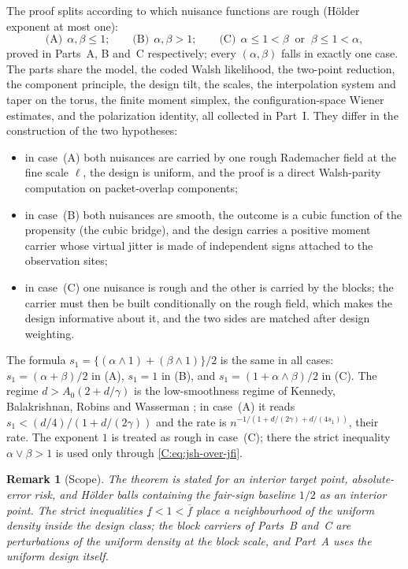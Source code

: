 \documentclass[11pt]{article}
\newtheorem{remark}[remark]{Remark}
\begin{document}
The proof splits according to which nuisance functions are rough
(Hölder exponent at most one):
\[
 \text{(A)}\ \ \alpha,\beta\le1;\qquad
 \text{(B)}\ \ \alpha,\beta>1;\qquad
 \text{(C)}\ \ \alpha\le1<\beta\ \text{ or }\ \beta\le1<\alpha ,
\]
proved in Parts~A, B and~C respectively; every \((\alpha,\beta)\) falls in
exactly one case.  The parts share the model, the coded Walsh
likelihood, the two-point reduction, the component principle, the
design tilt, the scales, the interpolation system and taper on the
torus, the finite moment simplex, the configuration-space Wiener
estimates, and the polarization identity, all collected in Part~I.
They differ in the construction of the two hypotheses:
\begin{itemize}[leftmargin=*]
\item in case~(A) both nuisances are carried by one rough Rademacher
field at the fine scale \(\ell\), the design is uniform, and the proof is
a direct Walsh-parity computation on packet-overlap components;
\item in case~(B) both nuisances are smooth, the outcome is a cubic
function of the propensity (the cubic bridge), and the design
carries a positive moment carrier whose virtual jitter is made of
independent signs attached to the observation sites;
\item in case~(C) one nuisance is rough and the other is carried by the
blocks; the carrier must then be built conditionally on the rough field,
which makes the design informative about it, and the two sides are
matched after design weighting.
\end{itemize}
The formula \(s_1=\{(\alpha\wedge1)+(\beta\wedge1)\}/2\) is the same in all
cases: \(s_1=(\alpha+\beta)/2\) in (A), \(s_1=1\) in (B), and
\(s_1=(1+\alpha\wedge\beta)/2\) in (C).  The regime
\(d>A_0(2+d/\gamma)\) is the low-smoothness regime of Kennedy,
Balakrishnan, Robins and Wasserman \cite{KBRW}; in case~(A) it reads
\(s_1<(d/4)/(1+d/(2\gamma))\) and the rate is
\(n^{-1/(1+d/(2\gamma)+d/(4s_1))}\), their rate.  The exponent \(1\) is
treated as rough in case~(C); there the strict inequality
\(\alpha\vee\beta>1\) is used only through \eqref{C:eq:jsh-over-jfi}.

\begin{remark}[Scope]
The theorem is stated for an interior target point, absolute-error risk,
and Hölder balls containing the fair-sign baseline \(1/2\) as an interior
point.  The strict inequalities \(\underline f<1<\overline f\) place a
neighbourhood of the uniform density inside the design class; the block
carriers of Parts~B and~C are perturbations of the uniform density at
the block scale, and Part~A uses the uniform design itself.
\end{remark}
\end{document}
